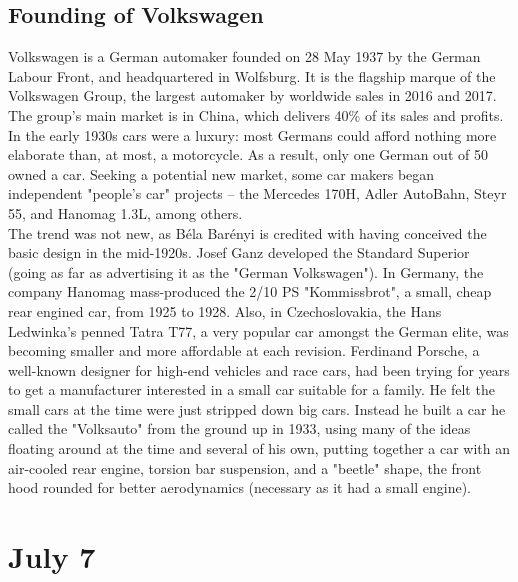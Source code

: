 \documentclass[11pt]{report}
\begin{document}
\subsection{Founding of Volkswagen}
Volkswagen is a German automaker founded on 28 May 1937 by the German Labour Front, and headquartered in Wolfsburg. It is the flagship marque of the Volkswagen Group, the largest automaker by worldwide sales in 2016 and 2017. The group's main market is in China, which delivers 40\% of its sales and profits.\\ \indent In the early 1930s cars were a luxury: most Germans could afford nothing more elaborate than, at most, a motorcycle. As a result, only one German out of 50 owned a car. Seeking a potential new market, some car makers began independent "people's car" projects – the Mercedes 170H, Adler AutoBahn, Steyr 55, and Hanomag 1.3L, among others.\\ \indent The trend was not new, as Béla Barényi is credited with having conceived the basic design in the mid-1920s. Josef Ganz developed the Standard Superior (going as far as advertising it as the "German Volkswagen"). In Germany, the company Hanomag mass-produced the 2/10 PS "Kommissbrot", a small, cheap rear engined car, from 1925 to 1928. Also, in Czechoslovakia, the Hans Ledwinka's penned Tatra T77, a very popular car amongst the German elite, was becoming smaller and more affordable at each revision. Ferdinand Porsche, a well-known designer for high-end vehicles and race cars, had been trying for years to get a manufacturer interested in a small car suitable for a family. He felt the small cars at the time were just stripped down big cars. Instead he built a car he called the "Volksauto" from the ground up in 1933, using many of the ideas floating around at the time and several of his own, putting together a car with an air-cooled rear engine, torsion bar suspension, and a "beetle" shape, the front hood rounded for better aerodynamics (necessary as it had a small engine).
\section{July 7}
\end{document}
